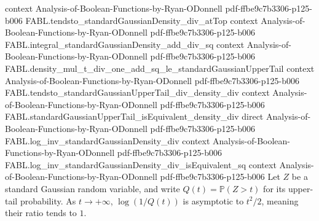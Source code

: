 \begin{theorem}
  {context}
  {Analysis-of-Boolean-Functions-by-Ryan-ODonnell}
  {pdf-ffbe9c7b3306-p125-b006}
\proofstep
  {FABL.tendsto_standardGaussianDensity_div_atTop}
  {context}
  {Analysis-of-Boolean-Functions-by-Ryan-ODonnell}
  {pdf-ffbe9c7b3306-p125-b006}
\proofstep
  {FABL.integral_standardGaussianDensity_add_div_sq}
  {context}
  {Analysis-of-Boolean-Functions-by-Ryan-ODonnell}
  {pdf-ffbe9c7b3306-p125-b006}
\proofstep
  {FABL.density_mul_t_div_one_add_sq_le_standardGaussianUpperTail}
  {context}
  {Analysis-of-Boolean-Functions-by-Ryan-ODonnell}
  {pdf-ffbe9c7b3306-p125-b006}
\proofstep
  {FABL.tendsto_standardGaussianUpperTail_div_density_div}
  {context}
  {Analysis-of-Boolean-Functions-by-Ryan-ODonnell}
  {pdf-ffbe9c7b3306-p125-b006}
\proofstep
  {FABL.standardGaussianUpperTail_isEquivalent_density_div}
  {direct}
  {Analysis-of-Boolean-Functions-by-Ryan-ODonnell}
  {pdf-ffbe9c7b3306-p125-b006}
\proofstep
  {FABL.log_inv_standardGaussianDensity_div}
  {context}
  {Analysis-of-Boolean-Functions-by-Ryan-ODonnell}
  {pdf-ffbe9c7b3306-p125-b006}
\proofstep
  {FABL.log_inv_standardGaussianDensity_div_isEquivalent_sq}
  {context}
  {Analysis-of-Boolean-Functions-by-Ryan-ODonnell}
  {pdf-ffbe9c7b3306-p125-b006}
Let $Z$ be a standard Gaussian random variable, and write $Q(t)=\mathbb{P}(Z>t)$ for its
upper-tail probability. As $t\to+\infty$, $\log(1/Q(t))$ is asymptotic to $t^2/2$,
meaning their ratio tends to $1$.
\end{theorem}

